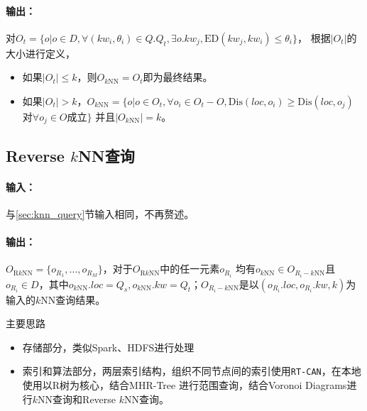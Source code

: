 \documentclass{ML}
\begin{document}
\paragraph{输出：}对$O_t = \{o | o \in D, \forall(kw_i, \theta_i) \in Q.Q_t, \exists o.kw_j, \mathrm{ED}(kw_j, kw_i) \leq \theta_i\}$，
根据$|O_t|$的大小进行定义，
\begin{itemize}
    \item 如果$|O_t| \leq k$，则$O_{k\mathrm{NN}} = O_t$即为最终结果。
    \item 如果$|O_t| > k$，$O_{k\mathrm{NN}}= \{o | o \in O_t, \forall o_i \in O_t - O, \mathrm{Dis}(loc, o_i) \ge \mathrm{Dis}(loc, o_j)$对$\forall o_j \in O$成立$\}$
    并且$|O_{k\mathrm{NN}}| = k$。
\end{itemize}

\subsection{Reverse $k$NN查询}\label{sec:RkNN-query}
\paragraph{输入：}与\ref{sec:knn_query}节输入相同，不再赘述。
\paragraph{输出：}$O_{\mathrm{R}k\mathrm{NN}} = \{o_{R_1}, \dots, o_{R_M}\}$，对于$O_{\mathrm{R}k\mathrm{NN}}$中的任一元素$o_{R_i}$
均有$o_{k\mathrm{NN}} \in O_{R_i-k\mathrm{NN}}$且$o_{R_i} \in D$，其中$o_{k\mathrm{NN}}.loc = Q_s, o_{k\mathrm{NN}}.kw = Q_t$；$O_{R_i-k\mathrm{NN}}$是以$(o_{R_i}.loc, o_{R_i}.kw, k)$为输入的$k$NN查询结果。

\newpage
主要思路\begin{itemize}
    \item 存储部分，类似Spark、HDFS进行处理
    \item 索引和算法部分，两层索引结构，组织不同节点间的索引使用\texttt{RT-CAN}\cite{RT-CAN}，在本地使用以R树为核心，结合MHR-Tree\cite{MHR-Tree}
    进行范围查询，结合Voronoi Diagrams\cite{VoR-Tree}进行$k$NN查询和Reverse $k$NN查询。
\end{itemize}
\end{document}
